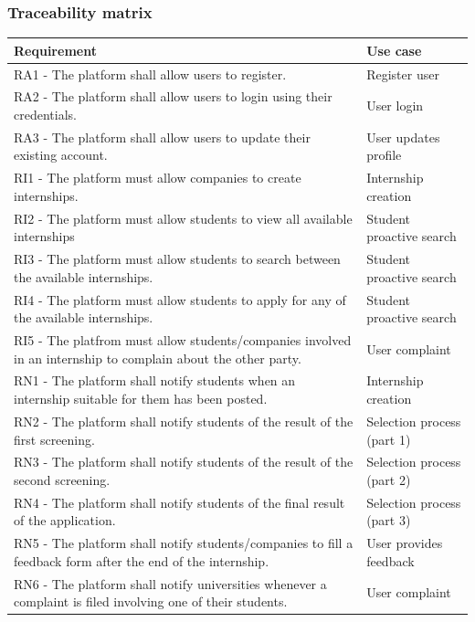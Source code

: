 \documentclass[11pt,twoside]{article}
\begin{document}
		\subsubsection{Traceability matrix}
\begin{table}[H]
\begin{tabular}{| >{\arraybackslash}m{} | >{\centering\arraybackslash}m{} |}
\hline
\textbf{Requirement} & \textbf{Use case} \\
\hline
RA1 - The platform shall allow users to register. & Register user \\
\hline
RA2 - The platform shall allow users to login using their credentials. & User login \\
\hline
RA3 - The platform shall allow users to update their existing account. & User updates profile \\
\hline
RI1 - The platform must allow companies to create internships. & Internship creation \\
\hline
RI2 - The platform must allow students to view all available internships & Student proactive search \\
\hline
RI3 - The platform must allow students to search between the available internships. & Student proactive search \\
\hline
RI4 - The platform must allow students to apply for any of the available internships. & Student proactive search \\
\hline
RI5 - The platfrom must allow students/companies involved in an internship to complain about the other party. & User complaint \\
\hline
RN1 - The platform shall notify students when an internship suitable for them has been posted. & Internship creation \\
\hline
RN2 - The platform shall notify students of the result of the first screening. & Selection process (part 1) \\
\hline
RN3 - The platform shall notify students of the result of the second screening. & Selection process (part 2) \\
\hline
RN4 - The platform shall notify students of the final result of the application. & Selection process (part 3) \\
\hline
RN5 - The platform shall notify students/companies to fill a feedback form after the end of the internship. & User provides feedback \\
\hline
RN6 - The platform shall notify universities whenever a complaint is filed involving one of their students. & User complaint \\

\end{tabular}
\end{table}
\end{document}
